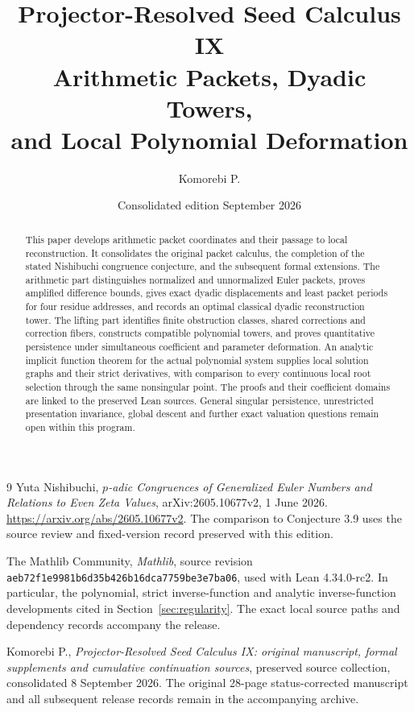 \documentclass[11pt]{article}
\title{\textbf{Projector-Resolved Seed Calculus IX}\\[5pt]
  \Large Arithmetic Packets, Dyadic Towers,\\ and Local Polynomial Deformation}
\author{Komorebi P.}
\date{Consolidated edition\quad 8 September 2026}
\theoremstyle{definition}
\theoremstyle{remark}
\numberwithin{equation}{section}
\begin{document}
\maketitle
\begin{abstract}
This paper develops arithmetic packet coordinates and their passage to local
reconstruction. It consolidates the original packet calculus, the completion
of the stated Nishibuchi congruence conjecture, and the subsequent formal
extensions. The arithmetic part distinguishes normalized and unnormalized
Euler packets, proves amplified difference bounds, gives exact dyadic
displacements and least packet periods for four residue addresses, and records
an optimal classical dyadic reconstruction tower. The lifting part identifies
finite obstruction classes, shared corrections and correction fibers, constructs
compatible polynomial towers, and proves quantitative persistence under
simultaneous coefficient and parameter deformation. An analytic implicit
function theorem for the actual polynomial system supplies local solution
graphs and their strict derivatives, with comparison to every continuous local
root selection through the same nonsingular point. The proofs and their
coefficient domains are linked to the preserved Lean sources. General singular
persistence, unrestricted presentation invariance, global descent and further
exact valuation questions remain open within this program.
\end{abstract}


\clearpage
{\small\setlength{\parskip}{0pt}\tableofcontents}
\clearpage







\begin{thebibliography}{9}
Yuta Nishibuchi,
\emph{$p$-adic Congruences of Generalized Euler Numbers and Relations to Even
Zeta Values}, arXiv:2605.10677v2, 1 June 2026.
\url{https://arxiv.org/abs/2605.10677v2}.
The comparison to Conjecture 3.9 uses the source review and fixed-version
record preserved with this edition.

The Mathlib Community,
\emph{Mathlib}, source revision
\nolinkurl{aeb72f1e9981b6d35b426b16dca7759be3e7ba06},
used with Lean 4.34.0-rc2.
In particular, the polynomial, strict inverse-function and analytic
inverse-function developments cited in Section~\ref{sec:regularity}.
The exact local source paths and dependency records accompany the release.

Komorebi P.,
\emph{Projector-Resolved Seed Calculus IX: original manuscript, formal
supplements and cumulative continuation sources}, preserved source collection,
consolidated 8 September 2026.
The original 28-page status-corrected manuscript and all subsequent release
records remain in the accompanying archive.
\end{thebibliography}
\end{document}
